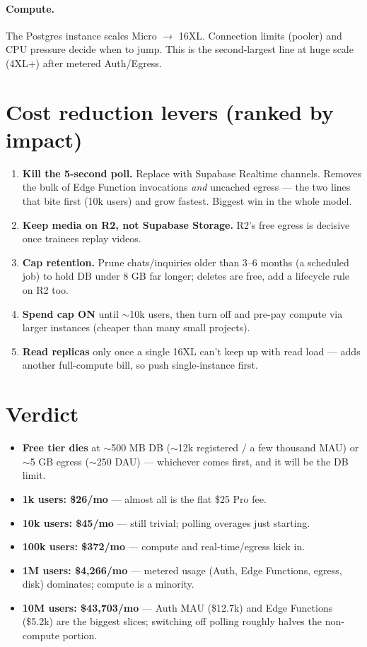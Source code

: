 \documentclass[11pt]{article}
\begin{document}
\paragraph{Compute.} The Postgres instance scales Micro $\to$ 16XL. Connection limits (pooler) and CPU pressure decide when to jump. This is the second-largest line at huge scale (4XL+) after metered Auth/Egress.

\section{Cost reduction levers (ranked by impact)}

\begin{enumerate}[leftmargin=*]
\item \textbf{Kill the 5-second poll.} Replace with Supabase Realtime channels. Removes the bulk of Edge Function invocations \emph{and} uncached egress — the two lines that bite first (10k users) and grow fastest. Biggest win in the whole model.
\item \textbf{Keep media on R2, not Supabase Storage.} R2's free egress is decisive once trainees replay videos.
\item \textbf{Cap retention.} Prune chats/inquiries older than 3--6 months (a scheduled job) to hold DB under 8 GB far longer; deletes are free, add a lifecycle rule on R2 too.
\item \textbf{Spend cap ON} until $\sim$10k users, then turn off and pre-pay compute via larger instances (cheaper than many small projects).
\item \textbf{Read replicas} only once a single 16XL can't keep up with read load — adds another full-compute bill, so push single-instance first.
\end{enumerate}

\section{Verdict}

\begin{itemize}[leftmargin=*,itemsep=2pt]
\item \textbf{Free tier dies} at $\sim$500 MB DB ($\sim$12k registered / a few thousand MAU) or $\sim$5 GB egress ($\sim$250 DAU) — whichever comes first, and it will be the DB limit.
\item \textbf{1k users: \$26/mo} — almost all is the flat \$25 Pro fee.
\item \textbf{10k users: \$45/mo} — still trivial; polling overages just starting.
\item \textbf{100k users: \$372/mo} — compute and real-time/egress kick in.
\item \textbf{1M users: \$4{,}266/mo} — metered usage (Auth, Edge Functions, egress, disk) dominates; compute is a minority.
\item \textbf{10M users: \$43{,}703/mo} — Auth MAU (\$12.7k) and Edge Functions (\$5.2k) are the biggest slices; switching off polling roughly halves the non-compute portion.
\end{itemize}
\end{document}
